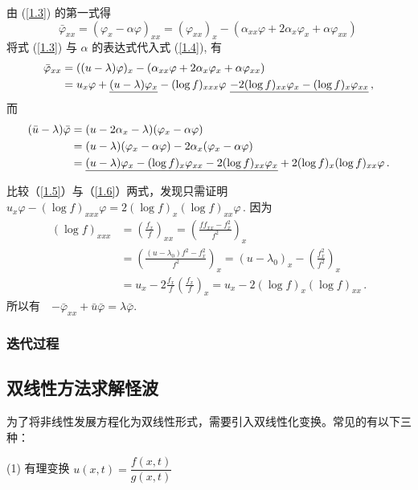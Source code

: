 由 (\ref{1.3}) 的第一式得
\begin{equation}
\bar{\varphi}_{xx} = (\varphi_{x}- \alpha \varphi)_{xx} = (\varphi_{xx})_x - (\alpha_{xx} \varphi + 2 \alpha_x \varphi_x + \alpha \varphi_{xx})\, \label{1.4}
\end{equation}
将式 (\ref{1.3}) 与 $\alpha$ 的表达式代入式 (\ref{1.4}), 有
\begin{align}
\bar{\varphi}_{xx} &= ((u - \lambda)\varphi)_x - (\alpha_{xx} \varphi + 2 \alpha_x \varphi_x + \alpha \varphi_{xx}) \notag \\
&= u_x \varphi + \underline{(u - \lambda)\varphi_x} - (\log f)_{xxx} \varphi \  \underline{- 2(\log f)_{xx} \varphi_x - (\log f)_x \varphi_{xx}}\,,\label{1.5}
\end{align}
而
\begin{align}
(\bar{u} - \lambda)\bar{\varphi} &= (u - 2 \alpha_x  - \lambda)(\varphi_x - \alpha \varphi) \notag \\
&= (u - \lambda)(\varphi_x - \alpha \varphi) - 2 \alpha_x (\varphi_x-\alpha  \varphi) \notag \\
&= \underline{(u - \lambda)\varphi_x-(\log f)_x \varphi_{xx} - 2(\log f)_{xx} \varphi_x } + 2(\log f)_x (\log f)_{xx} \varphi \,.\label{1.6}
\end{align}

比较（\ref{1.5}）与（\ref{1.6}）两式，发现只需证明\  $u_x \varphi - (\log f)_{xxx} \varphi = 2 (\log f)_x (\log f)_{xx} \varphi\, .$ 因为
\begin{align*}
(\log f)_{xxx}  &= (\frac{f_x}{f})_{xx} = (\frac{f f_{xx} - f_x^2}{f^2})_x  \\
&= (\frac{(u - \lambda_0) f^2 - f_x^2}{f^2})_x = (u - \lambda_0)_x - (\frac{f_x^2}{f^2})_x \\
&= u_x - 2 \frac{f_x}{f} (\frac{f_x}{f})_x = u_x - 2(\log f)_x (\log f)_{xx}\,.
\end{align*}
所以有\ \ $-\bar{\varphi}_{xx} + \bar{u} \bar{\varphi} = \lambda \bar{\varphi}.$

\subsubsection{迭代过程}
\subsection{双线性方法求解怪波}
为了将非线性发展方程化为双线性形式，需要引入双线性化变换。常见的有以下三种：

(1) 有理变换 $ u(x, t)=\dfrac{f(x, t)}{g(x, t)} $

